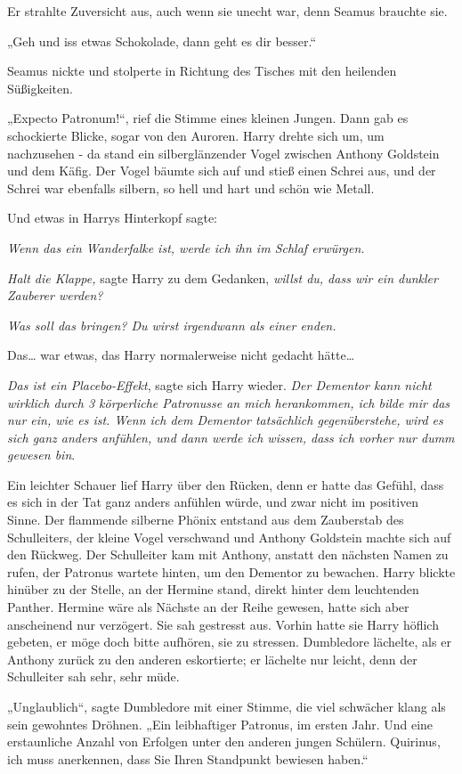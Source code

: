 {Er strahlte Zuversicht aus, auch wenn sie unecht war, denn Seamus brauchte sie.

„Geh und iss etwas Schokolade, dann geht es dir besser.“

Seamus nickte und stolperte in Richtung des Tisches mit den heilenden Süßigkeiten.

„Expecto Patronum!“, rief die Stimme eines kleinen Jungen. Dann gab es schockierte Blicke, sogar von den Auroren. Harry drehte sich um, um nachzusehen - da stand ein silberglänzender Vogel zwischen Anthony Goldstein und dem Käfig. Der Vogel bäumte sich auf und stieß einen Schrei aus, und der Schrei war ebenfalls silbern, so hell und hart und schön wie Metall.

Und etwas in Harrys Hinterkopf sagte:

\emph{Wenn das ein Wanderfalke ist, werde ich ihn im Schlaf erwürgen.}

\emph{Halt die Klappe,} sagte Harry zu dem Gedanken, \emph{willst du, dass wir ein dunkler Zauberer werden?}

\emph{Was soll das bringen? Du wirst irgendwann als einer enden.}

Das… war etwas, das Harry normalerweise nicht gedacht hätte…

\emph{Das ist ein Placebo-Effekt}, sagte sich Harry wieder. \emph{Der Dementor kann nicht wirklich durch 3 körperliche Patronusse an mich herankommen, ich bilde mir das nur ein, wie es ist. Wenn ich dem Dementor tatsächlich gegenüberstehe, wird es sich ganz anders anfühlen, und dann werde ich wissen, dass ich vorher nur dumm gewesen bin}.

Ein leichter Schauer lief Harry über den Rücken, denn er hatte das Gefühl, dass es sich in der Tat ganz anders anfühlen würde, und zwar nicht im positiven Sinne. Der flammende silberne Phönix entstand aus dem Zauberstab des Schulleiters, der kleine Vogel verschwand und Anthony Goldstein machte sich auf den Rückweg. Der Schulleiter kam mit Anthony, anstatt den nächsten Namen zu rufen, der Patronus wartete hinten, um den Dementor zu bewachen. Harry blickte hinüber zu der Stelle, an der Hermine stand, direkt hinter dem leuchtenden Panther. Hermine wäre als Nächste an der Reihe gewesen, hatte sich aber anscheinend nur verzögert. Sie sah gestresst aus. Vorhin hatte sie Harry höflich gebeten, er möge doch bitte aufhören, sie zu stressen. Dumbledore lächelte, als er Anthony zurück zu den anderen eskortierte; er lächelte nur leicht, denn der Schulleiter sah sehr, sehr müde.

„Unglaublich“, sagte Dumbledore mit einer Stimme, die viel schwächer klang als sein gewohntes Dröhnen. „Ein leibhaftiger Patronus, im ersten Jahr. Und eine erstaunliche Anzahl von Erfolgen unter den anderen jungen Schülern. Quirinus, ich muss anerkennen, dass Sie Ihren Standpunkt bewiesen haben.“

}
